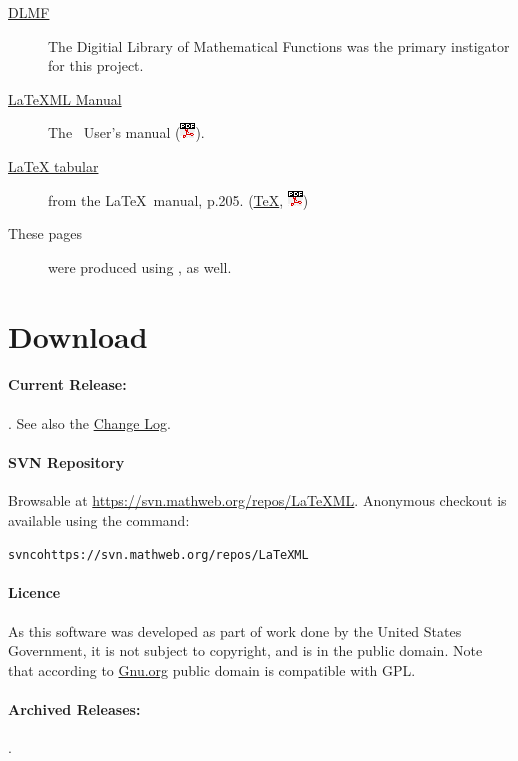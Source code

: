 \documentclass{article}
\newcommand{\PDFIcon}{\includegraphics{pdf}}
\begin{document}
\begin{description}
\item[\href{http://dlmf.nist.gov/contents/}{DLMF}]
   The Digitial Library of Mathematical Functions was the
   primary instigator for this project.
\item[\href{manual/}{LaTeXML Manual}]
   The \LaTeXML\ User's manual (\href{manual.pdf}{\PDFIcon}).
\item[\href{examples/tabular/tabular.html}{LaTeX tabular}]
    from the \LaTeX\ manual, p.205.
    (\href{examples/tabular/tabular.tex}{\TeX},
     \href{examples/tabular/tabular.pdf}{\PDFIcon})
\item[These pages] were produced using \LaTeXML, as well.
\end{description}

\section{Download}\label{download}
\paragraph{Current Release:}
\CurrentRelease.
See also the \href{Changes}{Change Log}.

\paragraph{SVN Repository}
Browsable at \url{https://svn.mathweb.org/repos/LaTeXML}.
Anonymous checkout is available using the command:
\begin{alltt}
  svn co https://svn.mathweb.org/repos/LaTeXML
\end{alltt}

\paragraph{Licence}
As this software was developed as part of work done by the
United States Government, it is not subject to copyright,
and is in the public domain.
Note that according to
\href{http://www.gnu.org/licences/license-list.html#PublicDomain}{Gnu.org}
public domain is compatible with GPL.

\paragraph{Archived Releases:}
\AllReleases.

\end{document}
